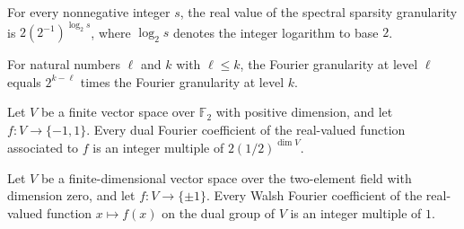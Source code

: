 \begin{theorem}
\label{FABL.spectralSparsityGranularity_cast}
\leanok
{}
For every nonnegative integer $s$, the real value of the spectral sparsity granularity
is $2(2^{-1})^{\operatorname{log}_2 s}$, where $\operatorname{log}_2 s$ denotes the
integer logarithm to base $2$.
\end{theorem}

\begin{theorem}
\label{FABL.degreeFourierGranularity_cast_eq_intCast_mul_of_le}
\leanok
{}
For natural numbers $\ell$ and $k$ with $\ell \le k$, the Fourier granularity at level
$\ell$ equals $2^{k-\ell}$ times the Fourier granularity at level $k$.
\end{theorem}

\begin{theorem}
\label{FABL.isDualFourierGranular_signValue_of_finrank_pos}
\leanok
{}
Let $V$ be a finite vector space over $\mathbb F_2$ with positive dimension, and let
$f:V\to\{-1,1\}$. Every dual Fourier coefficient of the real-valued function associated
to $f$ is an integer multiple of $2(1/2)^{\dim V}$.
\end{theorem}

\begin{theorem}
\label{FABL.isDualFourierGranular_signValue_of_finrank_zero}
\leanok
{}
Let $V$ be a finite-dimensional vector space over the two-element field with dimension
zero, and let $f:V\to\{\pm1\}$. Every Walsh Fourier coefficient of the real-valued
function $x\mapsto f(x)$ on the dual group of $V$ is an integer multiple of $1$.
\end{theorem}

